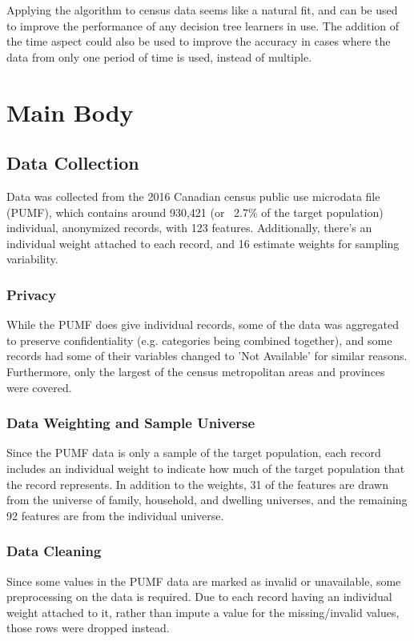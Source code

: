 \documentclass[10pt, conference, compsocconf]{IEEEtran}
\begin{document}
Applying the algorithm to census data seems like a natural fit, and can be used to improve the performance of any decision tree learners in use. The addition of the time aspect could also be used to improve the accuracy in cases where the data from only one period of time is used, instead of multiple.


\section{Main Body}

\subsection{Data Collection}
Data was collected from the 2016 Canadian census public use microdata file (PUMF), which contains around 930,421 (or ~2.7\% of the target population) individual, anonymized records, with 123 features. Additionally, there's an individual weight attached to each record, and 16 estimate weights for sampling variability.

\subsubsection{Privacy}
While the PUMF does give individual records, some of the data was aggregated to preserve confidentiality (e.g. categories being combined together), and some records had some of their variables changed to 'Not Available' for similar reasons. Furthermore, only the largest of the census metropolitan areas and provinces were covered. 

\subsubsection{Data Weighting and Sample Universe}
Since the PUMF data is only a sample of the target population, each record includes an individual weight to indicate how much of the target population that the record represents. In addition to the weights, 31 of the features are drawn from the universe of family, household, and dwelling universes, and the remaining 92 features are from the individual universe.

\subsubsection{Data Cleaning}
Since some values in the PUMF data are marked as invalid or unavailable, some preprocessing on the data is required. Due to each record having an individual weight attached to it, rather than impute a value for the missing/invalid values, those rows were dropped instead. 
\end{document}
